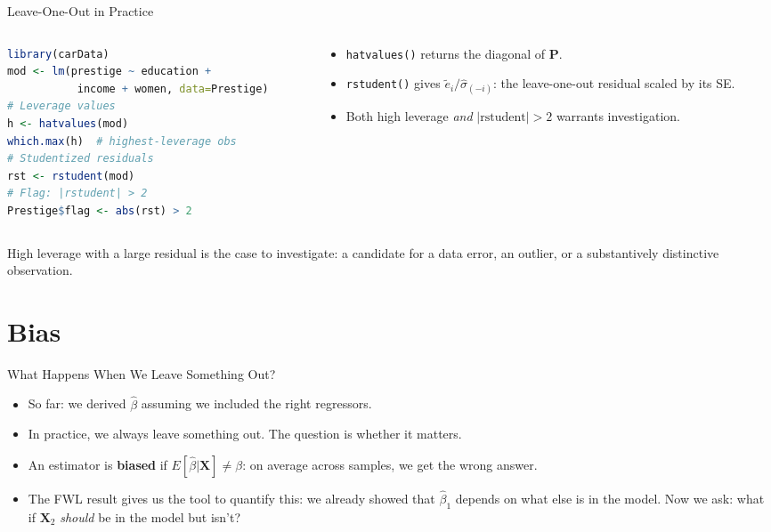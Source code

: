 \documentclass[aspectratio=169, handout, t]{beamer}
\numberwithin{equation}{section}
\begin{document}
\begin{frame}[fragile]{Leave-One-Out in Practice}
\begin{columns}[T]
\begin{column}{0.55\textwidth}
\begin{lstlisting}[language=R, basicstyle=\ttfamily\scriptsize, numbers=none]
library(carData)
mod <- lm(prestige ~ education +
           income + women, data=Prestige)
# Leverage values
h <- hatvalues(mod)
which.max(h)  # highest-leverage obs
# Studentized residuals
rst <- rstudent(mod)
# Flag: |rstudent| > 2
Prestige$flag <- abs(rst) > 2
\end{lstlisting}
\end{column}
\begin{column}{0.4\textwidth}
\begin{itemize}\setlength{\itemsep}{2pt}
\item \texttt{hatvalues()} returns the diagonal of $\bm{P}$.\pause
\item \texttt{rstudent()} gives $\tilde{e}_i/\hat{\sigma}_{(-i)}$: the leave-one-out residual scaled by its SE.\pause
\item Both high leverage \emph{and} $|\text{rstudent}|>2$ warrants investigation.
\end{itemize}
\end{column}
\end{columns}
\smallskip
\begin{tcolorbox}[colback=blue!5, colframe=blue!50, boxsep=2pt, top=2pt, bottom=2pt]
High leverage with a large residual is the case to investigate: a candidate for a data error, an outlier, or a substantively distinctive observation.
\end{tcolorbox}
\end{frame}



\section{Bias}


\begin{frame}{What Happens When We Leave Something Out?}
\begin{itemize}
\item So far: we derived $\hat{\beta}$ assuming we included the right regressors.\pause
\item In practice, we always leave something out. The question is whether it matters.\pause
\item An estimator is \textbf{biased} if $E[\hat{\beta}|\bm{X}]\neq\beta$: on average across samples, we get the wrong answer.\pause
\item The FWL result gives us the tool to quantify this: we already showed that $\hat{\beta}_1$ depends on what else is in the model. Now we ask: what if $\bm{X}_2$ \emph{should} be in the model but isn't?
\end{itemize}
\end{frame}
\end{document}
